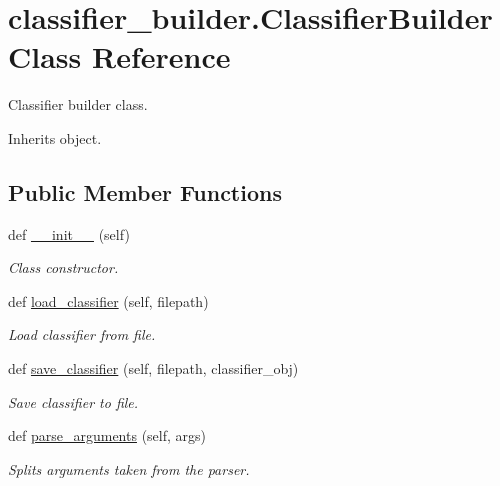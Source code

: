 \hypertarget{classclassifier__builder_1_1_classifier_builder}{}\section{classifier\+\_\+builder.\+Classifier\+Builder Class Reference}
\label{classclassifier__builder_1_1_classifier_builder}


Classifier builder class.  




Inherits object.

\subsection*{Public Member Functions}
\begin{DoxyCompactItemize}
\item 
\mbox{\label{classclassifier__builder_1_1_classifier_builder_a317121a8f9326d3a30dea3c8d6da4a2e}} 
def \mbox{\hyperlink{classclassifier__builder_1_1_classifier_builder_a317121a8f9326d3a30dea3c8d6da4a2e}{\+\_\+\+\_\+init\+\_\+\+\_\+}} (self)
\begin{DoxyCompactList}\small\item\em Class constructor. \end{DoxyCompactList}\item 
def \mbox{\hyperlink{classclassifier__builder_1_1_classifier_builder_aba174f3d7f78237e9a1bc53c8cb61109}{load\+\_\+classifier}} (self, filepath)
\begin{DoxyCompactList}\small\item\em Load classifier from file. \end{DoxyCompactList}\item 
def \mbox{\hyperlink{classclassifier__builder_1_1_classifier_builder_a3a7bc9a4619d927546fc82464767cd8a}{save\+\_\+classifier}} (self, filepath, classifier\+\_\+obj)
\begin{DoxyCompactList}\small\item\em Save classifier to file. \end{DoxyCompactList}\item 
def \mbox{\hyperlink{classclassifier__builder_1_1_classifier_builder_aa98a1ccc17d5be35f9b9a8762f19714b}{parse\+\_\+arguments}} (self, args)
\begin{DoxyCompactList}\small\item\em Splits arguments taken from the parser. \end{DoxyCompactList}\item 

\end{DoxyCompactItemize}
